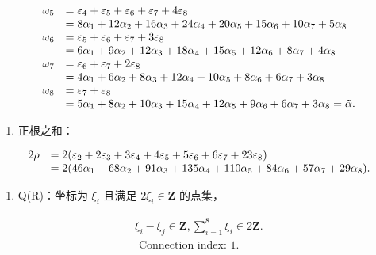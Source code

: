 \[
\begin{array}{r l} \omega_ {5} & = \varepsilon_ {4} + \varepsilon_ {5} + \varepsilon_ {6} + \varepsilon_ {7} + 4 \varepsilon_ {8} \\ & = 8 \alpha_ {1} + 12 \alpha_ {2} + 16 \alpha_ {3} + 24 \alpha_ {4} + 20 \alpha_ {5} + 15 \alpha_ {6} + 10 \alpha_ {7} + 5 \alpha_ {8} \\ \omega_ {6} & = \varepsilon_ {5} + \varepsilon_ {6} + \varepsilon_ {7} + 3 \varepsilon_ {8} \\ & = 6 \alpha_ {1} + 9 \alpha_ {2} + 12 \alpha_ {3} + 18 \alpha_ {4} + 15 \alpha_ {5} + 12 \alpha_ {6} + 8 \alpha_ {7} + 4 \alpha_ {8} \\ \omega_ {7} & = \varepsilon_ {6} + \varepsilon_ {7} + 2 \varepsilon_ {8} \\ & = 4 \alpha_ {1} + 6 \alpha_ {2} + 8 \alpha_ {3} + 12 \alpha_ {4} + 10 \alpha_ {5} + 8 \alpha_ {6} + 6 \alpha_ {7} + 3 \alpha_ {8} \\ \omega_ {8} & = \varepsilon_ {7} + \varepsilon_ {8} \\ & = 5 \alpha_ {1} + 8 \alpha_ {2} + 10 \alpha_ {3} + 15 \alpha_ {4} + 12 \alpha_ {5} + 9 \alpha_ {6} + 6 \alpha_ {7} + 3 \alpha_ {8} = \tilde {\alpha}. \end{array}
\]

\begin{enumerate}
\def\labelenumi{(\Roman{enumi})}
\setcounter{enumi}{6}
\tightlist
\item
  正根之和：
\end{enumerate}

\[
\begin{array}{r l} 2 \rho & = 2 (\varepsilon_ {2} + 2 \varepsilon_ {3} + 3 \varepsilon_ {4} + 4 \varepsilon_ {5} + 5 \varepsilon_ {6} + 6 \varepsilon_ {7} + 23 \varepsilon_ {8}) \\ & = 2 (46 \alpha_ {1} + 68 \alpha_ {2} + 91 \alpha_ {3} + 135 \alpha_ {4} + 110 \alpha_ {5} + 84 \alpha_ {6} + 57 \alpha_ {7} + 29 \alpha_ {8}). \end{array}
\]

\begin{enumerate}
\def\labelenumi{(\Roman{enumi})}
\setcounter{enumi}{7}
\tightlist
\item
  Q(R)：坐标为 \(\xi_{i}\) 且满足 \(2\xi_{i} \in \mathbf{Z}\) 的点集，
\end{enumerate}

\[
\begin{array}{l} \xi_ {i} - \xi_ {j} \in \mathbf {Z}, \sum_ {i = 1} ^ {8} \xi_ {i} \in 2 \mathbf {Z}. \\ \text { Connection   index: } 1. \end{array}
\]

